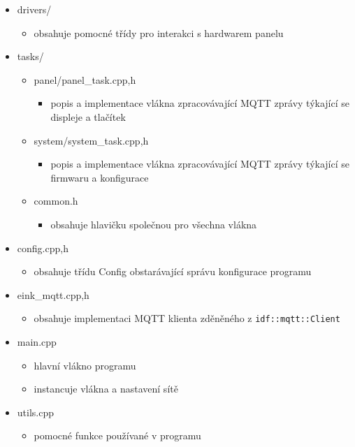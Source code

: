\begin{itemize}
    \item drivers/
    \begin{itemize}
        \item obsahuje pomocné třídy pro interakci s hardwarem panelu
    \end{itemize}
    \item tasks/
    \begin{itemize}
        \item panel/panel\_task.{cpp,h}
        \begin{itemize}
            \item popis a implementace vlákna zpracovávající MQTT zprávy týkající se displeje a tlačítek
        \end{itemize}
        \item system/system\_task.{cpp,h}
        \begin{itemize}
            \item popis a implementace vlákna zpracovávající MQTT zprávy týkající se firmwaru a konfigurace
        \end{itemize}
        \item common.h
            \begin{itemize}
                \item obsahuje hlavičku společnou pro všechna vlákna
            \end{itemize}
    \end{itemize}
    \item config.{cpp,h}
    \begin{itemize}
        \item obsahuje třídu Config obstarávající správu konfigurace programu
    \end{itemize}
    \item eink\_mqtt.{cpp,h}
    \begin{itemize}
        \item obsahuje implementaci MQTT klienta zděněného z \lstinline|idf::mqtt::Client|
    \end{itemize}
    \item main.cpp
    \begin{itemize}
        \item hlavní vlákno programu
        \item instancuje vlákna a nastavení sítě
    \end{itemize}
    \item utils.cpp
    \begin{itemize}
        \item pomocné funkce používané v programu
    \end{itemize}
\end{itemize}

